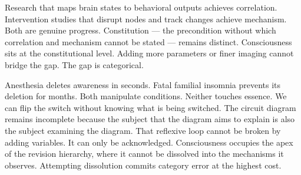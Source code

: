 Research that maps brain states to behavioral outputs achieves correlation. Intervention studies that disrupt nodes and track changes achieve mechanism. Both are genuine progress. Constitution — the precondition without which correlation and mechanism cannot be stated — remains distinct. Consciousness sits at the constitutional level. Adding more parameters or finer imaging cannot bridge the gap. The gap is categorical.

Anesthesia deletes awareness in seconds. Fatal familial insomnia prevents its deletion for months. Both manipulate conditions. Neither touches essence. We can flip the switch without knowing what is being switched. The circuit diagram remains incomplete because the subject that the diagram aims to explain is also the subject examining the diagram. That reflexive loop cannot be broken by adding variables. It can only be acknowledged. Consciousness occupies the apex of the revision hierarchy, where it cannot be dissolved into the mechanisms it observes. Attempting dissolution commits category error at the highest cost.

